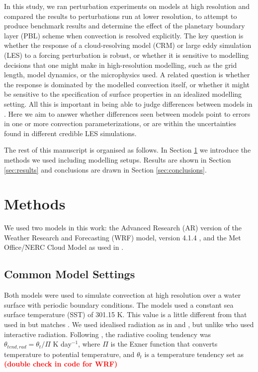 \documentclass[draft]{agujournal2019}
\newcommand{\todo}[1]{\textcolor{red}{\textbf{(#1)}}}
\begin{document}
In this study, we ran perturbation experiments on models at high resolution and
compared the results to perturbations run at lower resolution, to attempt to
produce benchmark results and determine the effect of the planetary boundary
layer (PBL) scheme when convection is resolved explicitly. The key question is
whether the response of a cloud-resolving model (CRM) or large eddy simulation
(LES) to a forcing perturbation is robust, or whether it is sensitive to
modelling decisions that one might make in high-resolution modelling, such as
the grid length, model dynamics, or the microphysics used. A related question is
whether the response is dominated by the modelled convection itself, or whether
it might be sensitive to the specification of surface properties in an idealized
modelling setting. All this is important in being able to judge differences
between models in . Here we aim to answer whether
differences seen between models point to errors in one or more convection
parameterizations, or are within the uncertainties found in different credible
LES simulations. 

The rest of this manuscript is organised as follows. In Section
\ref{sec:methods} we introduce the methods we used including modelling setups.
Results are shown in Section \ref{sec:results} and conclusions are drawn in
Section \ref{sec:conclusions}.

\section{Methods}
\label{sec:methods}

We used two models in this work: the Advanced Research (AR) version of the
Weather Research and Forecasting (WRF) model, version 4.1.4
\cite{Skamarock_2019}, and the Met Office/NERC Cloud Model
\cite<MONC,>{Brown_2020} as used in .

\subsection{Common Model Settings}

Both models were used to simulate convection at high resolution over a water
surface with periodic boundary conditions. The models used a constant sea
surface temperature (SST) of 301.15 K. This value is a little different from
that used in  but matches . We
used idealised radiation as in  and
, but unlike  who used interactive
radiation. Following , the radiative cooling tendency
was $\theta_{tend,rad} = \theta_t/\Pi$ K day$^{-1}$, where $\Pi$ is the Exner
function that converts temperature to potential temperature, and $\theta_t$ is a
temperature tendency set as \todo{double check in code for WRF}
\end{document}
